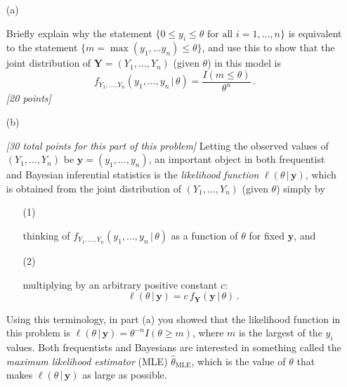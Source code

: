\documentclass[12pt]{article}
\newcommand{\given}{\, | \,}
\begin{document}
\begin{itemize}

\item[(a)] 

Briefly explain why the statement $\{ 0 \le y_i \le \theta \mbox{ for all } i = 1, \ldots, n \}$ is equivalent to the statement $\{ m = \max \left( y_1, \ldots y_n \right) \le \theta \}$, and use this to show that the joint distribution of $\bm{ Y } = ( Y_1, \dots, Y_n )$ (given $\theta$) in this model is
\begin{equation} \label{uniform-2}
f_{ Y_1, \dots, Y_n } ( y_1, \dots, y_n \given \theta ) = \frac{ I ( m \le \theta ) }{ \theta^n } \, .
\end{equation}
\textit{[20 points]}

\item[(b)]

\textit{[30 total points for this part of this problem]} Letting the observed values of $( Y_1, \dots, Y_n )$ be $\bm{ y } = ( y_1, \dots, y_n )$, an important object in both frequentist and Bayesian inferential statistics is the \textit{likelihood function} $\ell ( \theta \given \bm{ y } )$, which is obtained from the joint distribution of $( Y_1, \dots, Y_n )$ (given $\theta$) simply by
\begin{itemize}

\item[(1)]

thinking of $f_{ Y_1, \dots, Y_n } ( y_1, \dots, y_n \given \theta )$ as a function of $\theta$ for fixed $\bm{ y }$, and

\item[(2)]

multiplying by an arbitrary positive constant $c$:
\begin{equation} \label{uniform-2.1}
\ell ( \theta \given \bm{ y } ) = c \, f_{ \bm{ Y } } ( \bm{ y } \given \theta ) \, .
\end{equation}

\end{itemize}
Using this terminology, in part (a) you showed that the likelihood function in this problem is $\ell ( \theta \given \bm{ y } ) = \theta^{ - n } I ( \theta \ge m )$, where $m$ is the largest of the $y_i$ values. Both frequentists and Bayesians are interested in something called the \textit{maximum likelihood estimator} (MLE) $\hat{ \theta }_{ \text{MLE} }$, which is the value of $\theta$ that makes $\ell ( \theta \given \bm{ y } )$ as large as possible. 

\begin{itemize}


\end{itemize}
\end{itemize}
\end{document}
